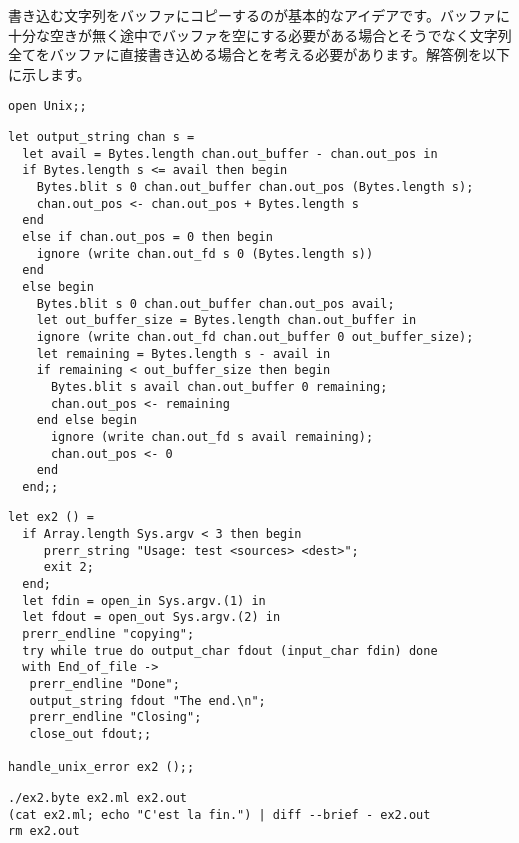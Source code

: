 \begin{answer}
書き込む文字列をバッファにコピーするのが基本的なアイデアです。バッファに十分な空きが無く途中でバッファを空にする必要がある場合とそうでなく文字列全てをバッファに直接書き込める場合とを考える必要があります。解答例を以下に示します。
%
\begin{lstlisting}
open Unix;;
\end{lstlisting}
%
\begin{lstlisting}
let output_string chan s =
  let avail = Bytes.length chan.out_buffer - chan.out_pos in
  if Bytes.length s <= avail then begin
    Bytes.blit s 0 chan.out_buffer chan.out_pos (Bytes.length s);
    chan.out_pos <- chan.out_pos + Bytes.length s
  end
  else if chan.out_pos = 0 then begin
    ignore (write chan.out_fd s 0 (Bytes.length s))
  end
  else begin
    Bytes.blit s 0 chan.out_buffer chan.out_pos avail;
    let out_buffer_size = Bytes.length chan.out_buffer in
    ignore (write chan.out_fd chan.out_buffer 0 out_buffer_size);
    let remaining = Bytes.length s - avail in
    if remaining < out_buffer_size then begin
      Bytes.blit s avail chan.out_buffer 0 remaining;
      chan.out_pos <- remaining
    end else begin
      ignore (write chan.out_fd s avail remaining);
      chan.out_pos <- 0
    end
  end;;
\end{lstlisting}
%
\begin{lstlisting}
let ex2 () =
  if Array.length Sys.argv < 3 then begin
     prerr_string "Usage: test <sources> <dest>";
     exit 2;
  end;
  let fdin = open_in Sys.argv.(1) in
  let fdout = open_out Sys.argv.(2) in
  prerr_endline "copying";
  try while true do output_char fdout (input_char fdin) done
  with End_of_file ->
   prerr_endline "Done";
   output_string fdout "The end.\n";
   prerr_endline "Closing";
   close_out fdout;;

handle_unix_error ex2 ();;
\end{lstlisting}
%
\begin{lstlisting}
./ex2.byte ex2.ml ex2.out
(cat ex2.ml; echo "C'est la fin.") | diff --brief - ex2.out
rm ex2.out
\end{lstlisting}
\end{answer}



